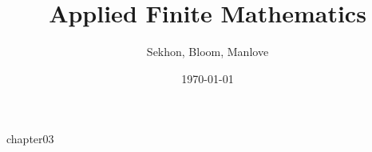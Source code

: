 \documentclass[12pt]{book}
\begin{document}

\frontmatter
\title{Applied Finite Mathematics}
\author{Sekhon, Bloom, Manlove}
\date{\today}
\maketitle
\tableofcontents

\mainmatter
{chapter03}


\backmatter
\end{document}
